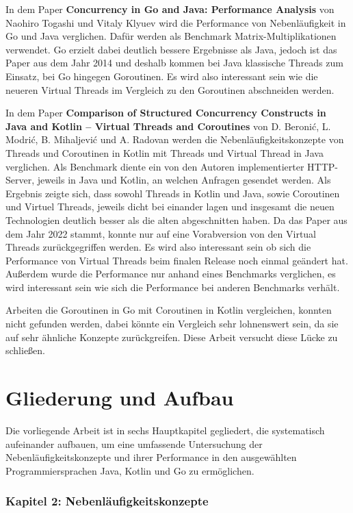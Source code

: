 \documentclass[fontsize=12pt,paper=a4,twoside=semi,parskip=half-,headsepline,headinclude]{scrreprt}
\begin{document}
In dem Paper \textbf{Concurrency in Go and Java: Performance Analysis} \cite{Togashi2014} von Naohiro Togashi und Vitaly Klyuev wird die Performance von Nebenläufigkeit in Go und Java verglichen. Dafür werden als Benchmark Matrix-Multiplikationen verwendet. Go erzielt dabei deutlich bessere Ergebnisse als Java, jedoch ist das Paper aus dem Jahr 2014 und deshalb kommen bei Java klassische Threads zum Einsatz, bei Go hingegen Goroutinen. Es wird also interessant sein wie die neueren Virtual Threads im Vergleich zu den Goroutinen abschneiden werden.

In dem Paper \textbf{Comparison of Structured Concurrency Constructs in Java and Kotlin – Virtual Threads and Coroutines} \cite{Modric2022} von D. Beronić, L. Modrić, B. Mihaljević und A. Radovan werden die Nebenläufigkeitskonzepte von Threads und Coroutinen in Kotlin mit Threads und Virtual Thread in Java verglichen. Als Benchmark diente ein von den Autoren implementierter HTTP-Server, jeweils in Java und Kotlin, an welchen Anfragen gesendet werden. Als Ergebnis zeigte sich, dass sowohl Threads in Kotlin und Java, sowie Coroutinen und Virtuel Threads, jeweils dicht bei einander lagen und insgesamt die neuen Technologien deutlich besser als die alten abgeschnitten haben. Da das Paper aus dem Jahr 2022 stammt, konnte nur auf eine Vorabversion von den Virtual Threads zurückgegriffen werden. Es wird also interessant sein ob sich die Performance von Virtual Threads beim finalen Release noch einmal geändert hat. Außerdem wurde die Performance nur anhand eines Benchmarks verglichen, es wird interessant sein wie sich die Performance bei anderen Benchmarks verhält.

Arbeiten die Goroutinen in Go mit Coroutinen in Kotlin vergleichen, konnten nicht gefunden werden, dabei könnte ein Vergleich sehr lohnenswert sein, da sie auf sehr ähnliche Konzepte zurückgreifen. Diese Arbeit versucht diese Lücke zu schließen.

\section{Gliederung und Aufbau}

Die vorliegende Arbeit ist in sechs Hauptkapitel gegliedert, die systematisch aufeinander aufbauen, um eine umfassende Untersuchung der Nebenläufigkeitskonzepte und ihrer Performance in den ausgewählten Programmiersprachen Java, Kotlin und Go zu ermöglichen.

\subsubsection{Kapitel 2: Nebenläufigkeitskonzepte}
\end{document}
